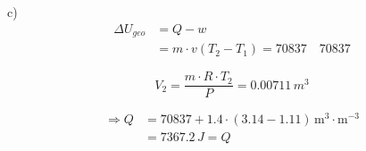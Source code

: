 c)
\begin{align*}
    \Delta U_{geo} &= Q - w \\
    &= m \cdot v (T_2 - T_1) = 70837 \quad 70837
\end{align*}

\[
V_2 = \frac{m \cdot R \cdot T_2}{P} = 0.00711 \, m^3
\]

\begin{align*}
    \Rightarrow Q &= 70837 + 1.4 \cdot \left( 3.14 - 1.11 \right) \, \text{m}^3 \cdot \text{m}^{-3} \\
    &= 7367.2 \, J = Q
\end{align*}